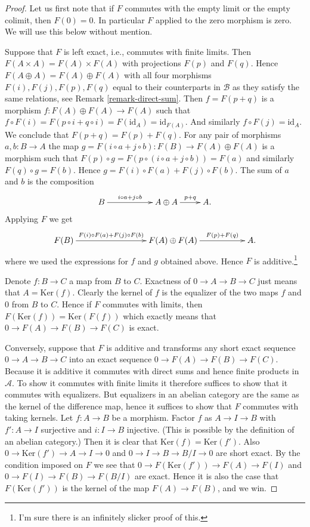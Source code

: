 \begin{proof}
Let us first note that if $F$ commutes with the empty limit or
the empty colimit, then $F(0) = 0$. In particular $F$ applied
to the zero morphism is zero. We will use this below without mention.

\medskip\noindent
Suppose that $F$ is left exact, i.e., commutes with finite limits.
Then $F(A \times A) = F(A) \times F(A)$ with
projections $F(p)$ and $F(q)$. Hence
$F(A \oplus A) = F(A) \oplus F(A)$ with all
four morphisms $F(i), F(j), F(p), F(q)$ equal to their
counterparts in $\mathcal{B}$ as they satisfy the same
relations, see Remark \ref{remark-direct-sum}.
Then $f = F(p + q)$ is a morphism $f : F(A) \oplus F(A) \to F(A)$
such that $f \circ F(i) = F(p \circ i + q \circ i) = F(\text{id}_A)
= \text{id}_{F(A)}$. And similarly $f \circ F(j) = \text{id}_A$.
We conclude that $F(p + q) = F(p) + F(q)$. For
any pair of morphisms $a, b : B \to A$ the map
$g = F(i \circ a + j \circ b) : F(B) \to F(A) \oplus F(A)$
is a morphism such that $F(p) \circ g =
F(p \circ (i \circ a + j \circ b)) = F(a)$ and similarly
$F(q) \circ g = F(b)$. Hence $g = F(i) \circ F(a) + F(j) \circ F(b)$.
The sum of $a$ and $b$ is the composition
$$
\xymatrix{
B \ar[rr]^-{i \circ a + j \circ b} & &
A \oplus A \ar[r]^-{p + q} & A.
}
$$
Applying $F$ we get
$$
\xymatrix{
F(B) \ar[rrr]^-{F(i) \circ F(a) + F(j) \circ F(b)} & & &
F(A) \oplus F(A) \ar[rr]^-{F(p) + F(q)} & &
A.
}
$$
where we used the expressions for $f$ and $g$ obtained above.
Hence $F$ is additive.\footnote{I'm sure there is an infinitely
slicker proof of this.}

\medskip\noindent
Denote $f : B \to C$ a map from $B$ to $C$.
Exactness of $0 \to A \to B \to C$ just means that
$A = \text{Ker}(f)$. Clearly the kernel of $f$ is
the equalizer of the two maps $f$ and $0$ from $B$ to $C$.
Hence if $F$ commutes with limits, then $F(\text{Ker}(f))
= \text{Ker}(F(f))$ which exactly means that
$0 \to F(A) \to F(B) \to F(C)$ is exact.

\medskip\noindent
Conversely, suppose that $F$ is additive and
transforms any short exact sequence $0 \to A \to B \to C$ into
an exact sequence $0 \to F(A) \to F(B) \to F(C)$.
Because it is additive it commutes with direct sums
and hence finite products in $\mathcal{A}$. To show
it commutes with finite limits it therefore
suffices to show that it commutes with
equalizers. But equalizers in an abelian category
are the same as the kernel of the difference map,
hence it suffices to show that $F$ commutes with
taking kernels. Let $f : A \to B$ be a morphism.
Factor $f$ as $A \to I \to B$ with $f' : A \to I$ surjective
and $i : I \to B$ injective. (This is possible by the
definition of an abelian category.) Then it is
clear that $\text{Ker}(f) = \text{Ker}(f')$. Also
$0 \to \text{Ker}(f') \to A \to I \to 0$
and
$0 \to I \to B \to B/I \to 0$
are short exact. By the condition imposed on $F$
we see that
$0 \to F(\text{Ker}(f')) \to F(A) \to F(I)$
and
$0 \to F(I) \to F(B) \to F(B/I)$
are exact. Hence it is also the case that
$F(\text{Ker}(f'))$ is the kernel of the map
$F(A) \to F(B)$, and we win.


\end{proof}
